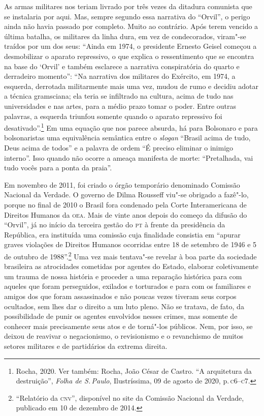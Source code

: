 As armas militares nos teriam livrado por três vezes da ditadura
comunista que se instalaria por aqui. Mas, sempre segundo essa narrativa
do ``Orvil'', o perigo ainda não havia passado por completo. Muito ao
contrário. Após terem vencido a última batalha, os militares da linha
dura, em vez de condecorados, viram"-se traídos por um dos seus: ``Ainda
em 1974, o presidente Ernesto Geisel começou a desmobilizar o aparato
repressivo, o que explica o ressentimento que se encontra na base do
`Orvil' e também esclarece a narrativa conspiratória do quarto e
derradeiro momento'': ``Na narrativa dos militares do Exército, em 1974,
a esquerda, derrotada militarmente mais uma vez, mudou de rumo e decidiu
adotar a técnica gramsciana; ela teria se infiltrado na cultura, acima
de tudo nas universidades e nas artes, para a médio prazo tomar
o poder. Entre outras palavras, a esquerda triunfou somente quando o
aparato repressivo foi desativado''.\footnote{Rocha, 2020. Ver também:
  Rocha, João César de Castro. ``A arquitetura da destruição'',
  \emph{Folha de S.\,Paulo}, Ilustríssima, 09 de agosto de 2020, p.\,\textsc{c6--c7}.} Em uma equação que nos parece absurda, há para Bolsonaro e
para bolsonaristas uma equivalência semântica entre o \emph{slogan}
``Brasil acima de tudo, Deus acima de todos'' e a palavra de ordem ``É
preciso eliminar o inimigo interno''. Isso quando não ocorre a ameaça
manifesta de morte: ``Pretalhada, vai tudo vocês para a ponta da
praia''.

Em novembro de 2011, foi criado o órgão temporário denominado Comissão
Nacional da Verdade. O governo de Dilma Rousseff viu"-se obrigado a
fazê"-lo, porque no final de 2010 o Brasil fora condenado pela Corte
Interamericana de Direitos Humanos da \textsc{oea}. Mais de vinte anos depois do
começo da difusão do ``Orvil'', já no início da terceira gestão do \textsc{pt} à
frente da presidência da República, era instituída uma comissão cuja
finalidade consistia em ``apurar graves violações de Direitos Humanos
ocorridas entre 18 de setembro de 1946 e 5 de outubro de
1988''.\footnote{``Relatório da \textsc{cnv}'', disponível no site da Comissão Nacional da Verdade, publicado em 10 de dezembro de 2014.}
Uma vez mais tentava"-se revelar à boa parte da sociedade brasileira as
atrocidades cometidas por agentes do Estado, elaborar coletivamente um
trauma de nossa história e proceder a uma reparação histórica para com
aqueles que foram perseguidos, exilados e torturados e para com os
familiares e amigos dos que foram assassinados e não poucas vezes
tiveram seus corpos ocultados, sem lhes dar o direito a um luto pleno.
Não se tratava, de fato, da possibilidade de punir os agentes envolvidos
nesses crimes, mas somente de conhecer mais precisamente seus atos e de
torná"-los públicos. Nem, por isso, se deixou de reavivar o negacionismo,
o revisionismo e o revanchismo de muitos setores militares e de
partidários da extrema direita.

